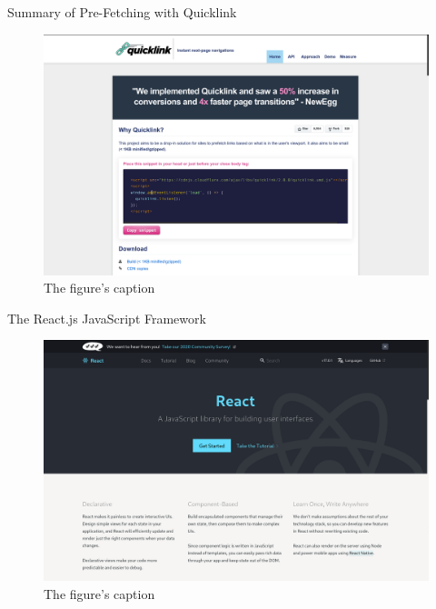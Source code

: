 \documentclass[14pt,aspectratio=169]{beamer}
\begin{document}
%
\begin{frame}{Summary of Pre-Fetching with Quicklink}
  \begin{figure}
    \centering
    \includegraphics[scale=.08]{images/quicklink.png}
    \caption{The figure's caption}
  \end{figure}
\end{frame}

%
\begin{frame}{The React.js JavaScript Framework}
  \begin{figure}
    \centering
    \includegraphics[scale=.08]{images/reactjs.png}
    \caption{The figure's caption}
  \end{figure}
\end{frame}
\end{document}
